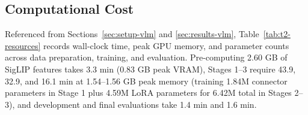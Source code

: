 \documentclass{article}
\begin{document}
\subsection{Computational Cost}
\label{app:vlm-cost}
Referenced from Sections~\ref{sec:setup-vlm} and \ref{sec:results-vlm}, Table~\ref{tab:t2-resources} records wall-clock time, peak GPU memory, and parameter counts across data preparation, training, and evaluation. Pre-computing 2.60 GB of SigLIP features takes 3.3 min (0.83 GB peak VRAM), Stages 1--3 require 43.9, 32.9, and 16.1 min at 1.54--1.56 GB peak memory (training 1.84M connector parameters in Stage 1 plus 4.59M LoRA parameters for 6.42M total in Stages 2--3), and development and final evaluations take 1.4 min and 1.6 min.

\end{document}
